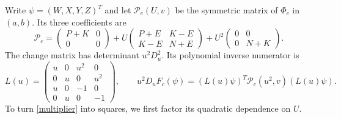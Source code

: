 \documentclass[11pt]{article}
\begin{document}
Write $\psi=(W,X,Y,Z)^T$ and let $\mathcal P_c(U,v)$
be the symmetric matrix of $\Phi_c$ in $(a,b)$. Its three coefficients are
\begin{equation}
\mathcal P_c=
\begin{pmatrix}P+K&0\\0&0\end{pmatrix}
+U\begin{pmatrix}P+E&K-E\\K-E&N+E\end{pmatrix}
+U^2\begin{pmatrix}0&0\\0&N+K\end{pmatrix}.\label{quadratic}
\end{equation}
The change matrix has determinant $u^2D_u^2$.  Its polynomial inverse
numerator is
\begin{equation}
L(u)=\begin{pmatrix}
u&0&u^2&0\\0&u&0&u^2\\u&0&-1&0\\0&u&0&-1
\end{pmatrix},\qquad
\boxed{u^2D_uF_c(\psi)=(L(u)\psi)^T
\mathcal P_c(u^2,v)(L(u)\psi).}\label{multiplier}
\end{equation}
To turn \eqref{multiplier} into squares, we first factor its quadratic dependence
on $U$.
\end{document}
